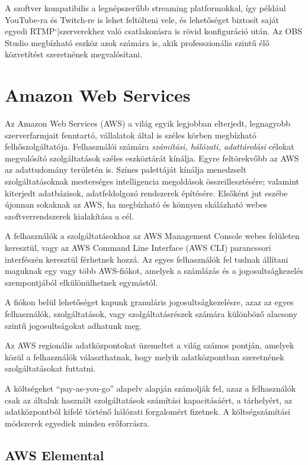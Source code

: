 A szoftver kompatibilis a legnépszerűbb streaming platformokkal, így például You\-Tube-ra és Twitch-re is lehet feltölteni vele, és lehetőséget biztosít saját egyedi RTMP`|szerverekhez való csatlakozásra is rövid konfiguráció után. Az OBS Studio megbízható eszköz azok számára is, akik professzionális szintű élő közvetítést szeretnének megvalósítani.

\section{Amazon Web Services}

Az Amazon Web Services (AWS) a világ egyik legjobban elterjedt, legnagyobb szerverfarmjait fenntartó, vállalatok által is széles körben megbízható felhőszolgáltatója\cite{aws}. Felhasználói számára \emph{számítási, hálózati, adattárolási} célokat megvalósító szolgáltatások széles eszköztárát kínálja. Egyre feltörekvőbb az AWS az adattudomány területén is. Színes palettáját kínálja menedzselt szolgáltatásoknak mesterséges intelligencia megoldások összeillesztésére; valamint kiterjedt adatbázisok, adatfeldolgozó rendszerek építésére. Elsőként jut eszébe újonnan sokaknak az AWS, ha megbízható és könnyen skálázható webes szoftverrendszerek kialakítása a cél.

A felhasználók a szolgáltatásokhoz az AWS Management Console webes felületen keresztül, vagy az AWS Command Line Interface (AWS CLI) parancssori interfészén keresztül férhetnek hozzá. Az egyes felhasználók fel tudnak állítani maguknak egy vagy több AWS-fiókot, amelyek a számlázás és a jogosultságkezelés szempontjából elkülönülhetnek egymástól.

A fiókon belül lehetőséget kapunk granuláris jogosultságkezelésre, azaz az egyes felhasználók, szolgáltatások, vagy szolgáltatásrészek számára különböző alacsony szintű jogosultságokat adhatunk meg.

Az AWS regionális adatközpontokat üzemeltet a világ számos pontján, amelyek közül a felhasználók választhatnak, hogy melyik adatközpontban szeretnének szolgáltatásokat futtatni.

A költségeket ``pay-as-you-go'' alapelv alapján számolják fel, azaz a felhasználók csak az általuk használt szolgáltatások számítási kapacitásáért, a tárhelyért, az adatközpontból kifelé történő hálózati forgalomért fizetnek. A költségszámítási módszerek egyediek minden erőforrásra.

\subsection{AWS Elemental}\label{sec:aws_elemental}

